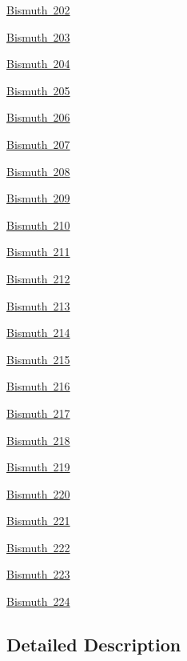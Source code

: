 \begin{DoxyCompactItemize}
\item 
\mbox{\hyperlink{group___isotope_const-_bismuth-_bi202}{Bismuth 202}}
\item 
\mbox{\hyperlink{group___isotope_const-_bismuth-_bi203}{Bismuth 203}}
\item 
\mbox{\hyperlink{group___isotope_const-_bismuth-_bi204}{Bismuth 204}}
\item 
\mbox{\hyperlink{group___isotope_const-_bismuth-_bi205}{Bismuth 205}}
\item 
\mbox{\hyperlink{group___isotope_const-_bismuth-_bi206}{Bismuth 206}}
\item 
\mbox{\hyperlink{group___isotope_const-_bismuth-_bi207}{Bismuth 207}}
\item 
\mbox{\hyperlink{group___isotope_const-_bismuth-_bi208}{Bismuth 208}}
\item 
\mbox{\hyperlink{group___isotope_const-_bismuth-_bi209}{Bismuth 209}}
\item 
\mbox{\hyperlink{group___isotope_const-_bismuth-_bi210}{Bismuth 210}}
\item 
\mbox{\hyperlink{group___isotope_const-_bismuth-_bi211}{Bismuth 211}}
\item 
\mbox{\hyperlink{group___isotope_const-_bismuth-_bi212}{Bismuth 212}}
\item 
\mbox{\hyperlink{group___isotope_const-_bismuth-_bi213}{Bismuth 213}}
\item 
\mbox{\hyperlink{group___isotope_const-_bismuth-_bi214}{Bismuth 214}}
\item 
\mbox{\hyperlink{group___isotope_const-_bismuth-_bi215}{Bismuth 215}}
\item 
\mbox{\hyperlink{group___isotope_const-_bismuth-_bi216}{Bismuth 216}}
\item 
\mbox{\hyperlink{group___isotope_const-_bismuth-_bi217}{Bismuth 217}}
\item 
\mbox{\hyperlink{group___isotope_const-_bismuth-_bi218}{Bismuth 218}}
\item 
\mbox{\hyperlink{group___isotope_const-_bismuth-_bi219}{Bismuth 219}}
\item 
\mbox{\hyperlink{group___isotope_const-_bismuth-_bi220}{Bismuth 220}}
\item 
\mbox{\hyperlink{group___isotope_const-_bismuth-_bi221}{Bismuth 221}}
\item 
\mbox{\hyperlink{group___isotope_const-_bismuth-_bi222}{Bismuth 222}}
\item 
\mbox{\hyperlink{group___isotope_const-_bismuth-_bi223}{Bismuth 223}}
\item 
\mbox{\hyperlink{group___isotope_const-_bismuth-_bi224}{Bismuth 224}}
\end{DoxyCompactItemize}


\subsection{Detailed Description}
